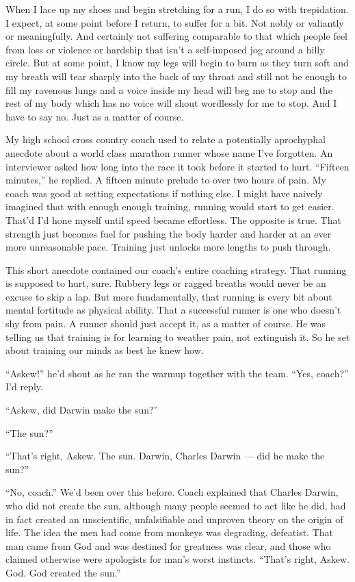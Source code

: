 \documentclass[14pt, oneside]{memoir}
\begin{document}
When I lace up my shoes and begin stretching for a run, I do so with
trepidation.
I expect, at some point before I return, to suffer for a bit.
Not nobly or valiantly or meaningfully.
And certainly not suffering comparable to that which people feel from
loss or violence or hardship that isn't a self-imposed jog around a
hilly circle.
But at some point, I know my legs will begin to burn as they turn
soft and my breath will tear sharply into the back of my throat and
still not be enough to fill my ravenous lungs and a voice inside my
head will beg me to stop and the rest of my body which has no voice
will shout wordlessly for me to stop.
And I have to say no.
Just as a matter of course.

My high school cross country couch used to relate a potentially
aprochyphal anecdote about a world class marathon runner whose name
I've forgotten.
An interviewer asked how long into the race it took before it started
to hurt.
``Fifteen minutes,'' he replied.
A fifteen minute prelude to over two hours of pain.
My coach was good at setting expectations if nothing else.
I might have naively imagined that with enough enough training,
running would start to get easier.
That'd I'd hone myself until speed became effortless.
The opposite is true.
That strength just becomes fuel for pushing the body harder and harder
at an ever more unreasonable pace.
Training just unlocks more lengths to push through.

This short anecdote contained our coach's entire coaching strategy.
That running is supposed to hurt, sure.
Rubbery legs or ragged breaths would never be an excuse to skip a lap.
But more fundamentally, that running is every bit about mental
fortitude as physical ability.
That a successful runner is one who doesn't shy from pain.
A runner should just accept it, as a matter of course.
He was telling us that training is for learning to weather pain, not
extinguish it.
So he set about training our minds as best he knew how.

``Askew!'' he'd shout as he ran the warmup together with the team.
``Yes, coach?'' I'd reply.

``Askew, did Darwin make the sun?''

``The sun?''

``That's right, Askew. The sun. Darwin, Charles Darwin --- did he make
the sun?''

``No, coach.'' We'd been over this before.
Coach explained that Charles Darwin, who did not create the sun,
although many people seemed to act like he did, had in fact created an
unscientific, unfalsifiable and unproven theory on the origin of life.
The idea the men had come from monkeys was degrading, defeatist.
That man came from God and was destined for greatness was clear, and
those who claimed otherwise were apologists for man's worst instincts.
``That's right, Askew. God. God created the sun.''
\end{document}
